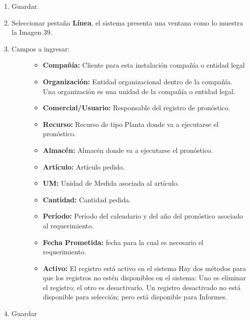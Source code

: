 \documentclass[letterpaper,10pt,spanish]{sphinxmanual}
\begin{document}
\begin{enumerate}
\begin{description}
\end{description}

\item {} 
Guardar.

\item {} 
Seleccionar pestaña \textbf{Línea}, el sistema presenta una ventana como lo muestra la Imagen 39.

\item {} \begin{description}
\item[{Campos a ingresar:}] \leavevmode\begin{itemize}
\item {} 
\textbf{Compañía:} Cliente para esta instalación compañía o entidad legal

\item {} 
\textbf{Organización:} Entidad organizacional dentro de la compañía. Una organización es una unidad de la compañía o entidad legal.

\item {} 
\textbf{Comercial/Usuario:} Responsable del registro de pronóstico.

\item {} 
\textbf{Recurso:} Recurso de tipo Planta donde va a ejecutarse el pronóstico.

\item {} 
\textbf{Almacén:} Almacén donde va a ejecutarse el pronóstico.

\item {} 
\textbf{Artículo:} Artículo pedido.

\item {} 
\textbf{UM:} Unidad de Medida asociada al artículo.

\item {} 
\textbf{Cantidad:} Cantidad pedida.

\item {} 
\textbf{Período:} Período del calendario y del año del pronóstico asociado al requerimiento.

\item {} 
\textbf{Fecha Prometida:} fecha para la cual es necesario el requerimiento.

\item {} 
\textbf{Activo:} El registro está activo en el sistema Hay dos métodos para que los registros no estén disponibles en el sistema: Uno es eliminar el registro; el otro es desactivarlo. Un registro desactivado no está disponible para selección; pero está disponible para Informes.

\end{itemize}

\end{description}

\item {} 
Guardar

\end{enumerate}
\end{document}
